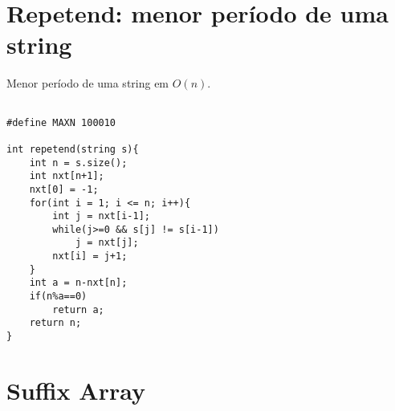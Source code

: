 \section{Repetend: menor período de uma string}

Menor período de uma string em $O(n)$.

\begin{multicols}{2}
	\begin{lstlisting}

#define MAXN 100010

int repetend(string s){
	int n = s.size();
	int nxt[n+1];
	nxt[0] = -1;
	for(int i = 1; i <= n; i++){
		int j = nxt[i-1];
		while(j>=0 && s[j] != s[i-1])
			j = nxt[j];
		nxt[i] = j+1;
	}
	int a = n-nxt[n];
	if(n%a==0)
		return a;
	return n;	
}

\end{lstlisting}
\end{multicols}
\section{Suffix Array}

